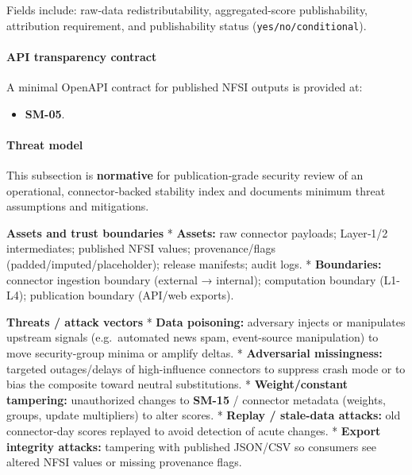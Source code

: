 \documentclass[
  11pt,
  peerreview,journal,onecolumn]{IEEEtran}
\newcommand{\passthrough}[1]{#1}
\providecommand{\tightlist}{%
  \setlength{\itemsep}{0pt}\setlength{\parskip}{0pt}}
\begin{document}
Fields include: raw-data redistributability, aggregated-score
publishability, attribution requirement, and publishability status
(\passthrough{\lstinline!yes/no/conditional!}).

\hypertarget{api-transparency-contract}{%
\paragraph{API transparency contract}\label{api-transparency-contract}}

A minimal OpenAPI contract for published NFSI outputs is provided at:

\begin{itemize}
\tightlist
\item
  \textbf{SM-05}.
\end{itemize}

\hypertarget{threat-model}{%
\paragraph{Threat model}\label{threat-model}}

This subsection is \textbf{normative} for publication‑grade security
review of an operational, connector‑backed stability index and documents
minimum threat assumptions and mitigations.

\textbf{Assets and trust boundaries} * \textbf{Assets:} raw connector
payloads; Layer‑1/2 intermediates; published NFSI values;
provenance/flags (padded/imputed/placeholder); release manifests; audit
logs. * \textbf{Boundaries:} connector ingestion boundary (external →
internal); computation boundary (L1-L4); publication boundary (API/web
exports).

\textbf{Threats / attack vectors} * \textbf{Data poisoning:} adversary
injects or manipulates upstream signals (e.g.~automated news spam,
event-source manipulation) to move security-group minima or amplify
deltas. * \textbf{Adversarial missingness:} targeted outages/delays of
high-influence connectors to suppress crash mode or to bias the
composite toward neutral substitutions. * \textbf{Weight/constant
tampering:} unauthorized changes to \textbf{SM-15} / connector metadata
(weights, groups, update multipliers) to alter scores. * \textbf{Replay
/ stale-data attacks:} old connector-day scores replayed to avoid
detection of acute changes. * \textbf{Export integrity attacks:}
tampering with published JSON/CSV so consumers see altered NFSI values
or missing provenance flags.
\end{document}
